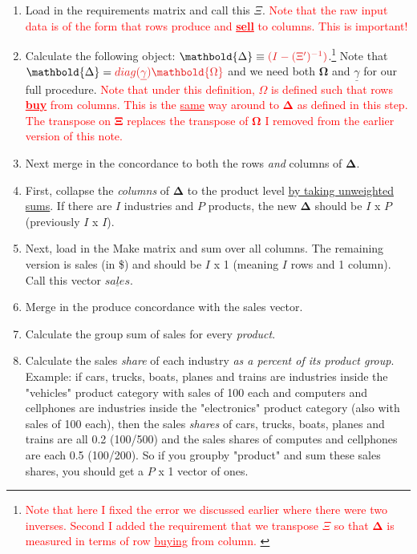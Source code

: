 \documentclass[12pt,english]{article}
\newcommand{\rlight}[1]{\textcolor{red}{#1}}
\begin{document}
\begin{enumerate}
	\item Load in the requirements matrix and call this $\Xi$. \rlight{Note that the raw input data is of the form that rows produce and {\bf \underline{sell}} to columns. This is important!}
	\item Calculate the following object: $\mathbold{\Delta} \equiv \rlight{(I-(\Xi')^{-1})}$.\footnote{\rlight{Note that here I fixed the error we discussed earlier where there were two inverses. Second I added the requirement that we transpose $\Xi$ so that $\mathbold{\Delta}$ is measured in terms of row \underline{buying} from column. }} Note that $\mathbold{\Delta} = \rlight{ diag(\underline{\gamma})\mathbold{\Omega}}$ and we need both $\mathbold{\Omega}$ and $\underline{\gamma}$ for our full procedure. \rlight{Note that under this definition, $\Omega$ is defined such that rows {\bf \underline{buy}} from columns. This is the \underline{same} way around to $\mathbold{\Delta}$ as defined in this step. The transpose on $\mathbold{\Xi}$ replaces the transpose of $\mathbold{\Omega}$ I removed from the earlier version of this note. }
	\item Next merge in the concordance to both the rows \emph{and} columns of $\mathbold{\Delta}$. 
	\item First, collapse the \emph{columns} of $\mathbold{\Delta}$ to the product level \underline{by taking unweighted sums}. If there are $I$ industries and $P$ products, the new $\mathbold{\Delta}$ should be $I$ x $P$ (previously $I$ x $I$).
	\item Next, load in the Make matrix and sum over all columns. The remaining version is sales (in \$) and should be $I$ x 1 (meaning $I$ rows and 1 column). Call this vector $\underline{sales}$.
	\item Merge in the produce concordance with the sales vector. 
	\item Calculate the group sum of sales for every \emph{product}.
	\item Calculate the sales \emph{share} of each industry \emph{as a percent of its product group}. Example: if cars, trucks, boats, planes and trains are industries inside the "vehicles" product category with sales of 100 each and computers and cellphones are industries inside the "electronics" product category (also with sales of 100 each), then the sales \emph{shares} of cars, trucks, boats, planes and trains are all 0.2 (100/500) and the sales shares of computes and cellphones are each 0.5 (100/200). So if you groupby "product" and sum these sales shares, you should get a $P$ x 1 vector of ones.

\end{enumerate}
\end{document}
